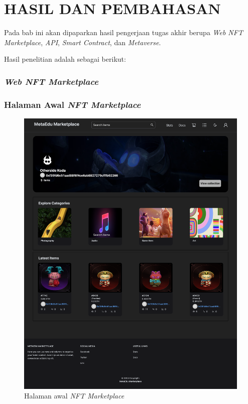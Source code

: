 \chapter{HASIL DAN PEMBAHASAN}
\label{chap:pengujiananalisis}

Pada bab ini akan dipaparkan hasil pengerjaan tugas akhir berupa \emph{Web NFT Marketplace}, \emph{API}, \emph{Smart Contract}, dan \emph{Metaverse}. 

Hasil penelitian adalah sebagai berikut:

\subsection{\emph{Web NFT Marketplace}}
\label{sec:webnftmarketplace}

\subsection{Halaman Awal \emph{NFT Marketplace}} 

\begin{figure} [H] \centering
  \includegraphics[scale=0.12]{gambar/img-frontend-index.png}
  \caption{Halaman awal \emph{NFT Marketplace}}
  \label{fig:NFTMarketplace}
\end{figure}


